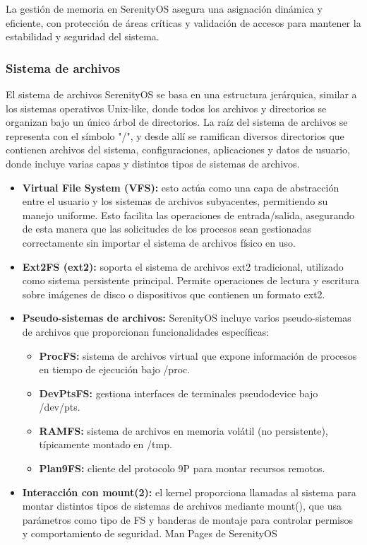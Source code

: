 La gestión de memoria en SerenityOS asegura una asignación dinámica y eficiente, con protección de áreas críticas y validación de accesos para mantener la estabilidad y seguridad del sistema.

\subsubsection{Sistema de archivos}

El sistema de archivos SerenityOS se basa en una estructura jerárquica, similar a los sistemas operativos Unix-like, donde todos los archivos y directorios se organizan bajo un único árbol de directorios. La raíz del sistema de archivos se representa con el símbolo "/", y desde allí se ramifican diversos directorios que contienen archivos del sistema, configuraciones, aplicaciones y datos de usuario, donde incluye varias capas y distintos tipos de sistemas de archivos.

\begin{itemize}
    \item \textbf{Virtual File System (VFS):} esto actúa como una capa de abstracción entre el usuario y los sistemas de archivos subyacentes, permitiendo su manejo uniforme. Esto facilita las operaciones de entrada/salida, asegurando de esta manera que las solicitudes de los procesos sean gestionadas correctamente sin importar el sistema de archivos físico en uso.
    \item \textbf{Ext2FS (ext2): } soporta el sistema de archivos ext2 tradicional, utilizado como sistema persistente principal. Permite operaciones de lectura y escritura sobre imágenes de disco o dispositivos que contienen un formato ext2. 
    \item \textbf{Pseudo-sistemas de archivos:} SerenityOS incluye varios pseudo-sistemas de archivos que proporcionan funcionalidades específicas:
    \begin{itemize}
        \item \textbf{ProcFS:} sistema de archivos virtual que expone información de procesos en tiempo de ejecución bajo /proc.

        \item \textbf{DevPtsFS:} gestiona interfaces de terminales pseudodevice bajo /dev/pts. 

        \item \textbf{RAMFS:} sistema de archivos en memoria volátil (no persistente), típicamente montado en /tmp.
        \item \textbf{Plan9FS:} cliente del protocolo 9P para montar recursos remotos.
    \end{itemize}
    \item \textbf{Interacción con mount(2):} el kernel proporciona llamadas al sistema para montar distintos tipos de sistemas de archivos mediante mount(), que usa parámetros como tipo de FS y banderas de montaje para controlar permisos y comportamiento de seguridad. 
Man Pages de SerenityOS
\end{itemize}


